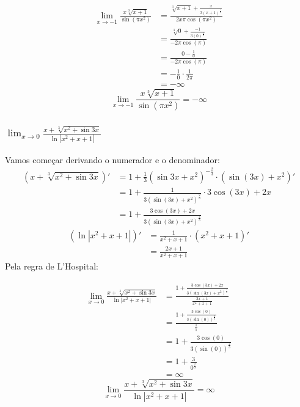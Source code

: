 \documentclass[12pt]{article}
\theoremstyle{definition}
\begin{document}
\begin{align*}
    \lim_{x\rightarrow -1} \frac{x\sqrt[3]{x+1}}{\sin{(\pi x^2)}}
    &= \frac{\sqrt[3]{x+1} + \frac{x}{{3(x+1)}^{\frac{2}{3}}}}{2x \pi \cos{(\pi x^2)}} \\
    &= \frac{\sqrt[3]{0} + \frac{-1}{{3(0)}^{\frac{2}{3}}}}{-2 \pi \cos{(\pi)}} \\
    &= \frac{0 -\frac{1}{0}}{-2\pi \cos{(\pi)}} \\
    &= -\frac{1}{0} \cdot \frac{1}{2\pi} \\
    &= -\infty
\end{align*}
\[
    \boxed{
        \lim_{x\rightarrow -1} \frac{x\sqrt[3]{x+1}}{\sin{(\pi x^2)}} = -\infty
    }
\]

\subsubsection{\(\lim_{x\rightarrow 0} \frac{x + \sqrt[3]{x^2+\sin{3x}}}{\ln{|x^2+x+1|}}\)}
Vamos começar derivando o numerador e o denominador:
\begin{align*}
    (x + \sqrt[3]{x^2 + \sin{3x}})'
    &= 1 + \frac{1}{3}{(\sin{3x}+x^2)}^{-\frac{2}{3}} \cdot (\sin{(3x)}+x^2)' \\
    &= 1 + \frac{1}{3{(\sin{(3x)}+x^2)}^{\frac{2}{3}}} \cdot 3\cos{(3x)}+2x \\
    &= 1 + \frac{3\cos{(3x) + 2x}}{3{(\sin{(3x)}+x^2)}^{\frac{2}{3}}}
\end{align*}
\begin{align*}
    (\ln{|x^2+x+1|})'
    &= \frac{1}{x^2+x+1} \cdot {(x^2+x+1)}' \\
    &= \frac{2x+1}{x^2+x+1}
\end{align*}
Pela regra de L'Hospital:

\begin{align*}
    \lim_{x\rightarrow 0} \frac{x + \sqrt[3]{x^2+\sin{3x}}}{\ln{|x^2+x+1|}}
    &= \frac{1 + \frac{3\cos{(3x) + 2x}}{3{(\sin{(3x)}+x^2)}^{\frac{2}{3}}}}{\frac{2x+1}{x^2+x+1}} \\
    &= \frac{1 + \frac{3\cos{(0)}}{3{(\sin{(0)})}^{\frac{2}{3}}}}{\frac{1}{1}} \\
    &= 1 + \frac{3\cos{(0)}}{3{(\sin{(0)})}^{\frac{2}{3}}} \\
    &= 1 + \frac{3}{0^{\frac{2}{3}}} \\
    &= \infty
\end{align*}
\[
    \boxed{
        \lim_{x\rightarrow 0} \frac{x + \sqrt[3]{x^2+\sin{3x}}}{\ln{|x^2+x+1|}} = \infty
    }
\]
\end{document}
